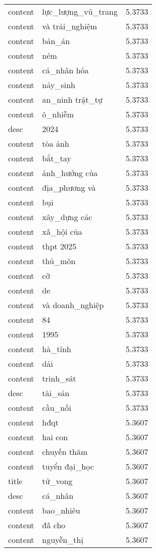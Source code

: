 \documentclass{article}
\begin{document}
\begin{tabular}{lll}
content & lực\_lượng\_vũ\_trang & 5.3733\\
content & và trải\_nghiệm & 5.3733\\
content & bản\_án & 5.3733\\
content & ném & 5.3733\\
content & cá\_nhân hóa & 5.3733\\
content & nảy\_sinh & 5.3733\\
content & an\_ninh trật\_tự & 5.3733\\
content & ô\_nhiễm & 5.3733\\
desc & 2024 & 5.3733\\
content & tòa ảnh & 5.3733\\
content & bắt\_tay & 5.3733\\
content & ảnh\_hưởng của & 5.3733\\
content & địa\_phương và & 5.3733\\
content & bụi & 5.3733\\
content & xây\_dựng các & 5.3733\\
content & xã\_hội của & 5.3733\\
content & thpt 2025 & 5.3733\\
content & thủ\_môn & 5.3733\\
content & cỡ & 5.3733\\
content & de & 5.3733\\
content & và doanh\_nghiệp & 5.3733\\
content & 84 & 5.3733\\
content & 1995 & 5.3733\\
content & hà\_tĩnh & 5.3733\\
content & dải & 5.3733\\
content & trinh\_sát & 5.3733\\
desc & tài\_sản & 5.3733\\
content & cầu\_nối & 5.3733\\
content & hđqt & 5.3607\\
content & hai con & 5.3607\\
content & chuyến thăm & 5.3607\\
content & tuyển đại\_học & 5.3607\\
title & tử\_vong & 5.3607\\
desc & cá\_nhân & 5.3607\\
content & bao\_nhiêu & 5.3607\\
content & đã cho & 5.3607\\
content & nguyễn\_thị & 5.3607\\

\end{tabular}
\end{document}
